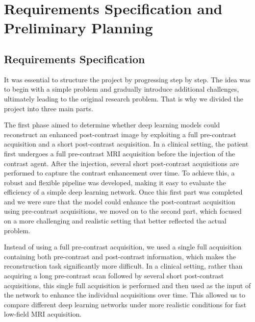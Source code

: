 \documentclass[12pt]{article}
\begin{document}
\section{Requirements Specification and Preliminary Planning}

\subsection{Requirements Specification}
It was essential to structure the project by progressing step by step. 
The idea was to begin with a simple problem and gradually introduce additional challenges, ultimately leading to the original research problem.
That is why we divided the project into three main parts.
\vspace{0.5cm}

The first phase aimed to determine whether deep learning models could reconstruct an enhanced post-contrast image by exploiting a full pre-contrast acquisition and a short post-contrast acquisition.
In a clinical setting, the patient first undergoes a full pre-contrast MRI acquisition before the injection of the contrast agent. 
After the injection, several short post-contrast acquisitions are performed to capture the contrast enhancement over time.
To achieve this, a robust and flexible pipeline was developed, making it easy to evaluate the efficiency of a simple deep learning network.
Once this first part was completed and we were sure that the model could enhance the post-contrast acquisition using pre-contrast acquisitions, we moved on to the second part, which focused on a more challenging and realistic setting that better reflected the actual problem.
\vspace{0.5cm}

Instead of using a full pre-contrast acquisition, we used a single full acquisition containing both pre-contrast and post-contrast information, which makes the reconstruction task significantly more difficult.
In a clinical setting, rather than acquiring a long pre-contrast scan followed by several short post-contrast acquisitions, this single full acquisition is performed and then used as the input of the network to enhance the individual acquisitions over time.
This allowed us to compare different deep learning networks under more realistic conditions for fast low-field MRI acquisition.
\vspace{0.5cm}
\end{document}
